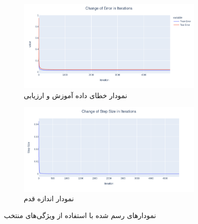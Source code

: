 \documentclass[14pt,a4]{article}
\begin{document}
\begin{figure}[h]
    \centering
     \begin{subfigure}{0.45\linewidth}
         \centering
         \includegraphics[width=\textwidth]{images/implementation/q2/part_d/selected_feature_error.png}
         \caption{نمودار خطای داده آموزش و ارزیابی}
     \end{subfigure}
     \hfill
     \begin{subfigure}{0.45\textwidth}
         \centering
         \includegraphics[width=\textwidth]{images/implementation/q2/part_d/selected_feature_step_size.png}
         \caption{نمودار اندازه قدم}
     \end{subfigure}
     \caption{نمودار‌های رسم شده با استفاده از ویژگی‌های منتخب}
     \label{q2-partd-selected-features}
\end{figure}
\end{document}
